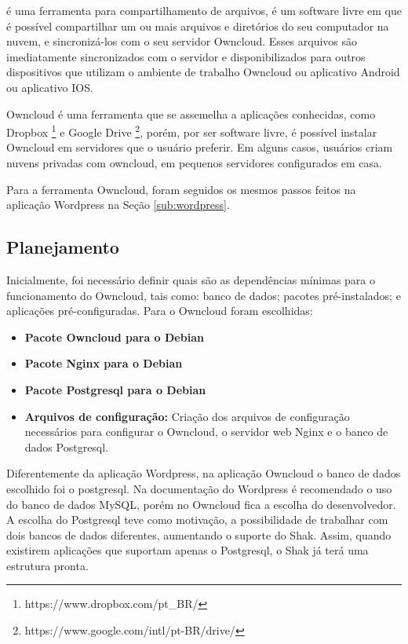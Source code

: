 é uma ferramenta para compartilhamento de arquivos, é um software 
livre em que é possível compartilhar
um ou mais arquivos e diretórios do seu computador na nuvem, e sincronizá-los com o seu
servidor Owncloud. Esses arquivos são imediatamente sincronizados com o servidor
e disponibilizados para outros dispositivos que utilizam o ambiente de trabalho
Owncloud ou aplicativo Android ou aplicativo IOS.

Owncloud é uma ferramenta que se assemelha a aplicações conhecidas, como Dropbox
\footnote{https://www.dropbox.com/pt\_BR/} e Google Drive \footnote{https://www.google.com/intl/pt-BR/drive/}, porém, por ser software livre, é possível instalar Owncloud em servidores
que o usuário preferir. Em alguns casos, usuários criam nuvens privadas com 
owncloud, em pequenos servidores configurados em casa.

Para a ferramenta Owncloud, foram seguidos os mesmos passos feitos na aplicação
Wordpress na Seção 
\ref{sub:wordpress}.

\subsection{Planejamento}

Inicialmente, foi necessário definir quais são as dependências
mínimas para o funcionamento do Owncloud, tais como: banco de dados; pacotes
pré-instalados; e aplicações pré-configuradas. Para o Owncloud foram escolhidas:

\begin{itemize}
   \item \textbf{Pacote Owncloud para o Debian}
   \item \textbf{Pacote Nginx para o Debian}
   \item \textbf{Pacote Postgresql para o Debian}
   \item \textbf{Arquivos de configuração:} Criação dos arquivos de configuração
   necessários para configurar o Owncloud, o servidor web Nginx e o banco de dados
   Postgresql.
\end{itemize}

Diferentemente da aplicação Wordpress, na aplicação Owncloud o 
banco de dados escolhido foi o postgresql. Na documentação do Wordpress é recomendado
o uso do banco de dados MySQL, porém no Owncloud fica a escolha do desenvolvedor.
A escolha do Postgresql teve como motivação, a possibilidade de trabalhar com dois bancos de
dados diferentes, aumentando o suporte do Shak. Assim, quando existirem aplicações
que suportam apenas o Postgresql, o Shak já terá uma estrutura pronta.

